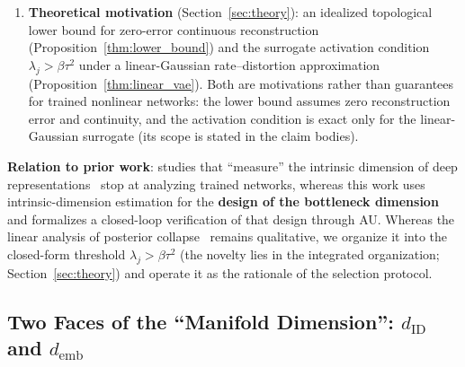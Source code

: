 \documentclass[make,article,submit,pdftex,moreauthors]{Definitions/mdpi}
\newcommand{\dID}{d_{\mathrm{ID}}}
\newcommand{\hatdID}{\hat{d}_{\mathrm{ID}}}
\newcommand{\demb}{d_{\mathrm{emb}}}
\begin{document}
\begin{enumerate}
        values~\cite{pope2021intrinsic} up to $m \approx 2\hatdID$ but
        inflates beyond;
        (c) for Conv-VAEs at $\beta_{\max} = 4$ no substantial truncation
        is observed within $m \leq 512$---consistent, under the surrogate
        interpretation, with an effective truncation threshold beyond the
        tested range---so AU verification requires a strengthened
        $\beta$ (the $\beta$-strengthened recovery achieves V1 only, not
        V2; 3 seeds), and Step 3 on natural images remains unresolved---the
        contributions are claimed inclusive of these limitations.
  \item \textbf{Theoretical motivation} (Section~\ref{sec:theory}):
        an idealized topological lower bound for zero-error continuous
        reconstruction (Proposition~\ref{thm:lower_bound}) and the
        surrogate activation condition $\lambda_j > \beta\tau^2$ under a
        linear-Gaussian rate--distortion approximation
        (Proposition~\ref{thm:linear_vae}).
        Both are motivations rather than guarantees for trained nonlinear
        networks: the lower bound assumes zero reconstruction error and
        continuity, and the activation condition is exact only for the
        linear-Gaussian surrogate (its scope is stated in the claim
        bodies).
\end{enumerate}

\textbf{Relation to prior work}:
studies that ``measure'' the intrinsic dimension of deep
representations~\cite{ansuini2019intrinsic,pope2021intrinsic,valeriani2023geometry}
stop at analyzing trained networks, whereas this work uses
intrinsic-dimension estimation for the \textbf{design of the bottleneck
dimension} and formalizes a closed-loop verification of that design through
AU.
Whereas the linear analysis of posterior collapse~\cite{lucas2019elbo}
remains qualitative, we organize it into the closed-form threshold
$\lambda_j > \beta\tau^2$ (the novelty lies in the integrated organization;
Section~\ref{sec:theory}) and operate it as the rationale of the selection
protocol.

\subsection{Two Faces of the ``Manifold Dimension'': $\dID$ and $\demb$}\label{sec:intro_dim}
\end{document}

